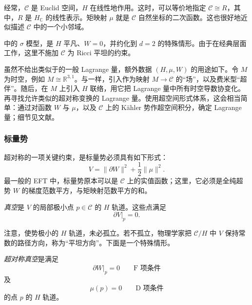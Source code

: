 经常，$\mathcal{C}$ 是 Euclid 空间，$H$ 在线性地作用。这时，可以等价地指定 $\mathcal{C}\cong R$，其中，$R$ 是 $H_{\mathbb{C}}$ 的线性表示。矩映射 $\mu$ 就是 $\mathcal{C}$ 自然坐标的二次函数。这也很好地近似描述 $\mathcal{C}$ 中的一个小邻域。

中的 $\sigma$ 模型，是 $H$ 平凡、$W=0$，并约化到 $d=2$ 的特殊情形。由于在经典层面工作，这里不施加 $\mathcal{C}$ 为 Ricci 平坦的约束。

虽然不给出类似于的一般 Lagrange 量，额外数据 $(H,\mu,W)$ 的用途如下。令 $M$ 为时空，例如 $M\cong\mathbb{R}^{3,1}$。与一样，引入作为映射 $M\to\mathcal{C}$ 的“场”，以及费米型“超伴”。随后，在 $M$ 上引入 $H$ 联络，用它把 Lagrange 量中所有时空导数协变化。再寻找允许类似的超对称变换的 Lagrange 量。使用超空间形式体系，这会相当简单：通过对函数 $W$ 与 $\mu$，以及 $\mathcal{C}$ 上的 K\"ahler 势作超空间积分，确定 Lagrange 量；细节见文献。

\subsubsection{标量势}\label{sec:5.4.1.2}

超对称的一项关键约束，是标量势必须具有如下形式：
\begin{equation}\label{eq:5.76}
V=\|\partial W\|^2+\frac{1}{2}\|\mu\|^2.
\end{equation}
最一般的 EFT 中，标量势原本可以是 $\mathcal{C}$ 上的实值函数；这里，它必须是全纯超势 $W$ 的梯度范数平方，与矩映射范数平方的和。
\begin{definition}\label{def:5.18}
\emph{真空}是 $V$ 的局部极小点 $p\in\mathcal{C}$ 的 $H$ 轨道。这些点满足
\begin{equation}\label{eq:5.77}
\partial V|_p=0.
\end{equation}
\end{definition}

注意，使势极小的 $H$ 轨道，未必孤立。若不孤立，物理学家把 $\mathcal{C}/H$ 中 $V$ 保持常数的路径方向，称为“平坦方向”。下面是一个特殊情形。
\begin{definition}\label{def:5.19}
\emph{超对称真空}是满足
\begin{equation}\label{eq:5.78}
\partial W|_p=0\qquad\text{F 项条件}
\end{equation}
及
\begin{equation}\label{eq:5.79}
\mu(p)=0\qquad\text{D 项条件}
\end{equation}
的点 $p$ 的 $H$ 轨道。
\end{definition}


